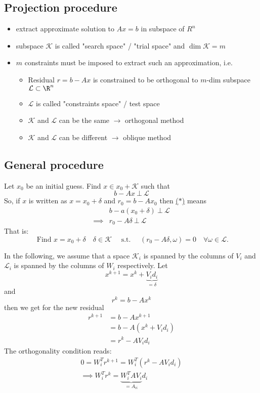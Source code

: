 \subsection*{Projection procedure}
\begin{itemize}
	\item extract approximate solution to $Ax=b$ in subspace of $R^{n}$
	\item subspace $\mathcal{K}$ is called "search space" / "trial space" and $\dim \mathcal{K} = m$
	\item $m$ constraints must be imposed to extract such an approximation, i.e.
		\begin{itemize}
			\item Residual $r = b -Ax$ is constrained to be orthogonal to $m$-dim subspace $\mathcal{L} \subset  \R^{n}$
			\item $\mathcal{L}$ is called "constraints space" / test space
			\item $\mathcal{K}$ and $\mathcal{L}$ can be the same $\rightarrow$ orthogonal method
			\item $\mathcal{K}$ and $\mathcal{L}$ can be different $\rightarrow$ oblique method
		\end{itemize}
\end{itemize}

\subsection*{General procedure}
\label{sec:General procedure}

Let $x_0$ be an initial guess. Find $x \in x_0 + \mathcal{K}$ such that
\begin{equation}\label{eq:generalproceedstar}\tag{$\ast$}
	b - Ax ~\bot~ \mathcal{L}
\end{equation}
So, if $x$ is written as $x=x_0 + \delta $ and $r_0 = b -Ax_0$ then \href{eq:generalproceedstar}{($\ast$)} means
\begin{align*}
	&b-a(x_0 + \delta ) ~\bot~\mathcal{L} \\
	\implies &r_0 - A \delta ~\bot~ \mathcal{L}
\end{align*}
That is:
\[
	\text{ Find } x = x_0 + \delta \quad \delta  \in \mathcal{K} \quad\text{ s.t. }\quad (r_0 - A \delta  , \omega ) = 0 \quad \forall \omega  \in \mathcal{L}
.\] 

In the following, we assume that a space $\mathcal{K}_{i}$ is spanned by the columns of $V_{i}$ and $\mathcal{L}_{i}$ is spanned by the columns of $W_{i}$ respectively.
Let
\[
x^{k+1} = x^{k} + \underbrace{V_{i}d_{i}}_{=\delta } 
\] 
and
\[
r^{k} = b - Ax^{k}
\] 
then we get for the new residual
\begin{align*}
	r^{k+1} &= b - Ax^{k+1} \\
			&= b- A(x^{k} + V_{i}d_{i}) \\
			&= r^{k} - AV_{i}d_{i}
\end{align*}
The orthogonality condition reads:
\begin{align*}
	0 = W_{i}^{T}r^{k+1} = W_{i}^{T}(r^{k}- AV_{i}d_{i}) \\
	\implies W_{i}^{T} r^{k} = \underbrace{W_{i}^{T} A V_{i}}_{= A_{ii}} d_{i} 
\end{align*}

